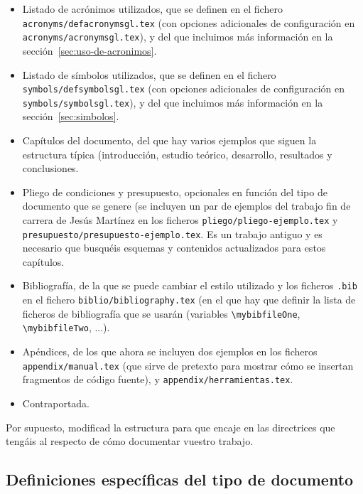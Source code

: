 {\begin{itemize}
    \item Listado de acrónimos utilizados, que se definen en el fichero \texttt{acronyms/defacronymsgl.tex} (con opciones adicionales de configuración en \texttt{acronyms/acronymsgl.tex}), y del que incluimos más información en la sección~\ref{sec:uso-de-acronimos}.
    \item Listado de símbolos utilizados, que se definen en el fichero \texttt{symbols/defsymbolsgl.tex} (con opciones adicionales de configuración en \texttt{symbols/symbolsgl.tex}), y del que incluimos más información en la sección~\ref{sec:simbolos}.


    \item Capítulos del documento, del que hay varios ejemplos que siguen la estructura típica (introducción, estudio teórico, desarrollo, resultados y conclusiones.

    \item Pliego de condiciones y presupuesto, opcionales en función del tipo de documento que se genere (se incluyen un par de ejemplos del trabajo fin de carrera de Jesús Martínez en los ficheros \texttt{pliego/pliego-ejemplo.tex} y \texttt{presupuesto/presupuesto-ejemplo.tex}. Es un trabajo antiguo y es necesario que busquéis esquemas y contenidos actualizados para estos capítulos.

    \item Bibliografía, de la que se puede cambiar el estilo utilizado y los ficheros \texttt{.bib} en el fichero \texttt{biblio/bibliography.tex} (en el que hay que definir la lista de ficheros de bibliografía que se usarán (variables \texttt{\textbackslash{}mybibfileOne}, \texttt{\textbackslash{}mybibfileTwo}, ...).

    \item Apéndices, de los que ahora se incluyen dos ejemplos en los ficheros \texttt{appendix/manual.tex} (que sirve de pretexto para mostrar cómo se insertan fragmentos de código fuente), y \texttt{appendix/herramientas.tex}.
    \item Contraportada.
  \end{itemize}

  Por supuesto, modificad la estructura para que encaje en las directrices que tengáis al respecto de cómo documentar vuestro trabajo.


  \subsection{Definiciones específicas del tipo de documento}
  \label{sec:definicion-del-tipo}

}
